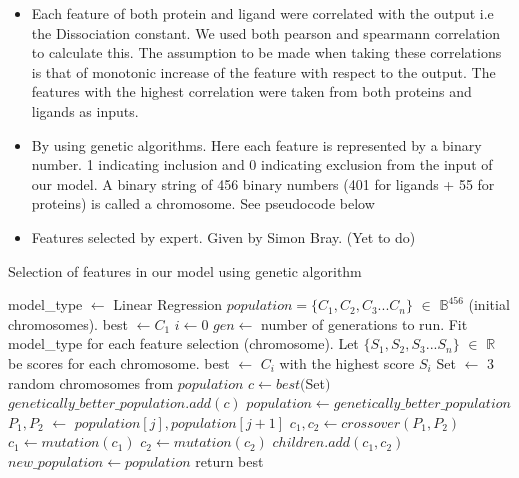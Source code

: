 \documentclass[11pt]{article}
\begin{document}
\begin{itemize}
\item Each feature of both protein and ligand were correlated with the output i.e the Dissociation constant.
We used both pearson and spearmann correlation to calculate this.
The assumption to be made when taking these correlations is that of monotonic increase of
the feature with respect to the output.
The features with the highest correlation were taken from both proteins and ligands as
inputs.
\item By using genetic algorithms\cite{genetic_algorithm}.
Here each feature is represented by a binary number.
1 indicating inclusion and 0 indicating exclusion from the input of our model.
A binary string of 456 binary numbers (401 for ligands + 55 for proteins) is called a chromosome.
See pseudocode below
\item Features selected by expert. Given by Simon Bray. (Yet to do)
\end{itemize}

\label{Genetic_Algo}
\begin{algorithm}
\caption{Selection of features in our model using genetic algorithm \cite{genetic_algorithm}}
\begin{algorithmic}[1]
\State model\_type $\gets$ Linear Regression
\State $ population = \{C_1, C_2, C_3... C_n\}$ $\in$ $\mathbb{B}^{456}$ (initial chromosomes).
\State best $\gets C_1$ 
\State $i \gets 0$
\State $gen \gets$ number of generations to run.
          \State Fit model\_type for each feature selection (chromosome). 
          \State Let $\{S_1, S_2, S_3... S_n\}$ $\in$ $\mathbb{R}$ be scores for each chromosome.
          \State best $\gets$ $C_i$ with the highest score $S_i$
              \State Set $\gets$ 3 random chromosomes from $population$
              \State $c \gets best($Set$)$
              \State $genetically\_better\_population.add(c)$
          \EndFor
          \State $population \gets genetically\_better\_population$
              \State $P_1, P_2$ $\gets$ $population[j], population[j+1]$
              \State $c_1, c_2 \gets crossover(P_1, P_2)$
              \State $c_1 \gets mutation(c_1)$
              \State $c_2 \gets mutation(c_2)$
              \State $children.add(c_1, c_2)$
          \EndFor
      \State $new\_population \gets population$
      \EndFor
\State return best
\EndProcedure
\end{algorithmic}
\end{algorithm}
\end{document}
